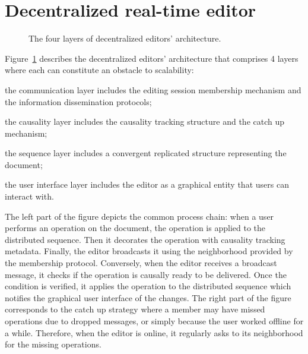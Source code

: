 
\section{Decentralized real-time editor}
\label{sec:editor}



\begin{figure}
  \centering
  
  \caption{\label{fig:architecture}The four layers of decentralized editors'
    architecture.}
\end{figure}


Figure~\ref{fig:architecture} describes the decentralized editors' architecture
that comprises 4 layers where each can constitute an obstacle to scalability:
\begin{inparaenum}[(i)]
\item the communication layer includes the editing session membership mechanism
  and the information dissemination protocols;
\item the causality layer includes the causality tracking structure and the
  catch up mechanism; %
\item the sequence layer includes a convergent replicated structure representing
  the document;
\item the user interface layer includes the editor as a graphical entity that
  users can interact with. %
\end{inparaenum}

The left part of the figure depicts the common process chain: when a user
performs an operation on the document, the operation is applied to the
distributed sequence. Then it decorates the operation with causality tracking
metadata. Finally, the editor broadcasts it using the neighborhood provided by
the membership protocol.  Conversely, when the editor receives a broadcast
message, it checks if the operation is causally ready to be delivered. Once the
condition is verified, it applies the operation to the distributed sequence
which notifies the graphical user interface of the changes.  The right part of
the figure corresponds to the catch up strategy where a member may have missed
operations due to dropped messages, or simply because the user worked offline
for a while. Therefore, when the editor is online, it regularly asks to its
neighborhood for the missing operations.

